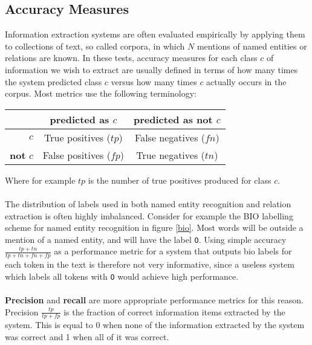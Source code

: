 \subsection{Accuracy Measures}
Information extraction systems are often evaluated empirically by applying them to collections of text, so called corpora, in which $N$ mentions of named entities or relations are known. In these tests, accuracy measures for each class $c$ of information we wish to extract are usually defined in terms of how many times the system predicted class $c$ versus how many times $c$ actually occurs in the corpus. Most metrics use the following terminology:

\begin{center}
	\begin{tabular}{r | c c}
	 & \textbf{predicted as $c$} & \textbf{predicted as not $c$}  \\ \hline
	$c$ & True positives ($tp$) & False negatives ($fn$) \\
	\textbf{not} $c$ & False positives ($fp$) & True negatives ($tn$)
\end{tabular}
\end{center}
Where for example $tp$ is the number of true positives produced for class $c$.
\\\\
The distribution of labels used in both named entity recognition and relation extraction is often highly imbalanced. Consider for example the BIO labelling scheme for named entity recognition in figure \ref{bio}. Most words will be outside a mention of a named entity, and will have the label \texttt{O}. Using simple accuracy $\frac{tp + tn}{tp + tn + fn + fp}$ as a performance metric for a system that outputs bio labels for each token in the text is therefore not very informative, since a useless system which labels all tokens with \texttt{O} would achieve high performance.
\\\\
\textbf{Precision} and \textbf{recall} are more appropriate performance metrics for this reason. Precision $\frac{tp}{tp + fp}$ is the fraction of correct information items extracted by the system. This is equal to 0 when none of the information extracted by the system was correct and 1 when all of it was correct. 

